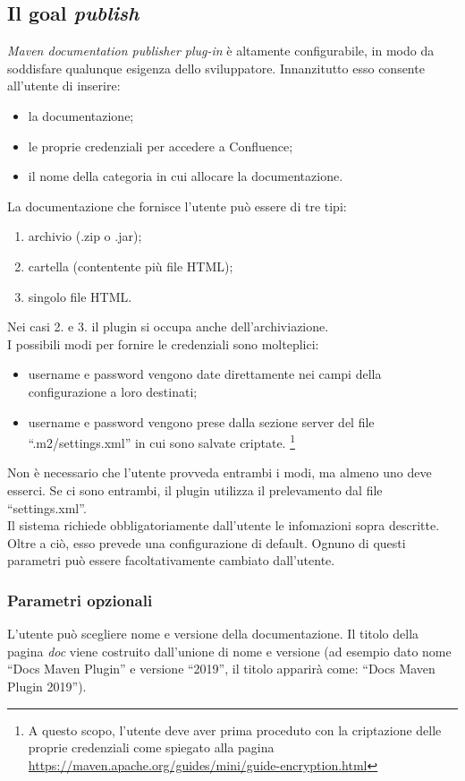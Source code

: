 \subsection{Il goal \emph{publish}} \label{goalPublish}
\emph{Maven documentation publisher plug-in} è altamente configurabile, in modo da soddisfare qualunque esigenza dello sviluppatore.
Innanzitutto esso consente all'utente di inserire:
\begin{itemize}
	\item la documentazione;
	\item le proprie credenziali per accedere a Confluence;	
	\item il nome della categoria in cui allocare la documentazione.
\end{itemize}
La documentazione che fornisce l'utente può essere di tre tipi:
\begin{enumerate}
	\item archivio (.zip o .jar);
	\item cartella (contentente più file HTML);
	\item singolo file HTML.
\end{enumerate}
Nei casi 2. e 3. il plugin si occupa anche dell'archiviazione. \\
I possibili modi per fornire le credenziali sono molteplici:
\begin{itemize}
	\item username e password vengono date direttamente nei campi della configurazione a loro destinati;
	\item username e password vengono prese dalla sezione server del file ``.m2/settings.xml'' in cui sono salvate criptate. \footnote{A questo scopo, l'utente deve aver prima proceduto con la criptazione delle proprie credenziali come spiegato alla pagina \url{https://maven.apache.org/guides/mini/guide-encryption.html}} 
\end{itemize}
Non è necessario che l'utente provveda entrambi i modi, ma almeno uno deve esserci.
Se ci sono entrambi, il plugin utilizza il prelevamento dal file ``settings.xml''. \\

Il sistema richiede obbligatoriamente dall'utente le infomazioni sopra descritte.
Oltre a ciò, esso prevede una configurazione di default.
Ognuno di questi parametri può essere facoltativamente cambiato dall'utente. 

	\subsubsection{Parametri opzionali} \label{parametriOpzionali}
	L'utente può scegliere nome e versione della documentazione.
	Il titolo della pagina \emph{doc} viene costruito dall'unione di nome e versione (ad esempio dato nome ``Docs Maven Plugin'' e versione ``2019'', il titolo apparirà come: ``Docs Maven Plugin 2019'').

